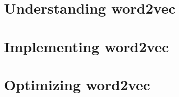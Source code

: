\documentclass{article}
\begin{document}
\section{Understanding word2vec}
\subsection{}


\subsection{}


\subsection{}


\subsection{}


\subsection{}


\subsection{}


\section{Implementing word2vec}
\setcounter{subsection}{4}
\subsection{}

\section{Optimizing word2vec}
\subsection{}

\subsection{}

\newpage


\end{document}
